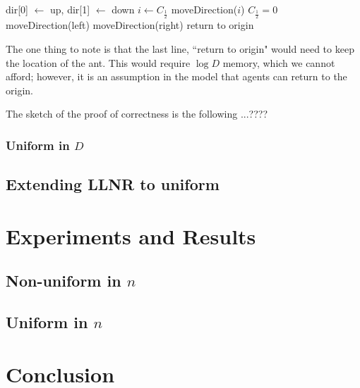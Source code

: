 \documentclass[runningheads,a4paper]{llncs}
\begin{document}
\begin{codebox}
\li dir[0] $\leftarrow$ up, dir[1] $\leftarrow$ down
\li $i \leftarrow C_{\frac{1}{2}}$
\li moveDirection($i$)
\li \If $C_{\frac{1}{2}} = 0$ \Then
\li moveDirection(left)
\li \Else moveDirection(right) \End \End
\li return to origin
\end{codebox}

The one thing to note is that the last line, ``return to origin" would need to keep the location of the ant. This would require $\log D$ memory, which we cannot afford; however, it is an assumption in the model that agents can return to the origin.

The sketch of the proof of correctness is the following ...????

\subsubsection{Uniform in $D$}

\subsection{Extending LLNR to uniform}

\section{Experiments and Results}
\label{experiments}

\subsection{Non-uniform in $n$}

\subsection{Uniform in $n$}

\section{Conclusion}
\label{conclusion}



\end{document}
